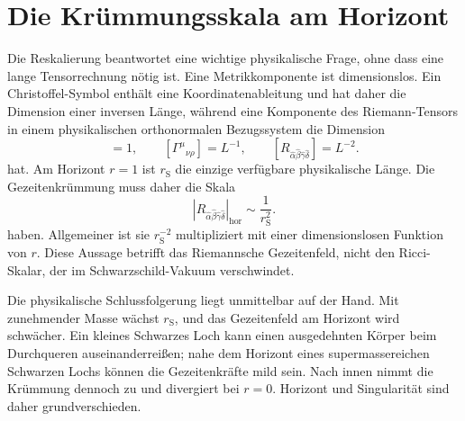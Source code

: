 \begin{classroomqa}
\end{classroomqa}

\section{Die Krümmungsskala am Horizont}

Die Reskalierung beantwortet eine wichtige physikalische Frage, ohne dass eine lange Tensorrechnung nötig ist. Eine Metrikkomponente ist dimensionslos. Ein Christoffel-Symbol enthält eine Koordinatenableitung und hat daher die Dimension einer inversen Länge, während eine Komponente des Riemann-Tensors in einem physikalischen orthonormalen Bezugssystem die Dimension
\begin{equation}
[g_{\mu\nu}]=1,
\qquad
[\Gamma^\mu{}_{\nu\rho}]=L^{-1},
\qquad
[R_{\hat\alpha\hat\beta\hat\gamma\hat\delta}]
=L^{-2}.
\label{eq:l7-curvature-dimensions}
\end{equation}
hat. Am Horizont \(r=1\) ist \(r_{\mathrm S}\) die einzige verfügbare physikalische Länge. Die Gezeitenkrümmung muss daher die Skala
\begin{equation}
\left|R_{\hat\alpha\hat\beta\hat\gamma\hat\delta}\right|_{\mathrm{hor}}
\sim \frac{1}{r_{\mathrm S}^2}.
\label{eq:l7-horizon-curvature}
\end{equation}
haben. Allgemeiner ist sie \(r_{\mathrm S}^{-2}\) multipliziert mit einer dimensionslosen Funktion von \(r\). Diese Aussage betrifft das Riemannsche Gezeitenfeld, nicht den Ricci-Skalar, der im Schwarzschild-Vakuum verschwindet.

Die physikalische Schlussfolgerung liegt unmittelbar auf der Hand. Mit zunehmender Masse wächst \(r_{\mathrm S}\), und das Gezeitenfeld am Horizont wird schwächer. Ein kleines Schwarzes Loch kann einen ausgedehnten Körper beim Durchqueren auseinanderreißen; nahe dem Horizont eines supermassereichen Schwarzen Lochs können die Gezeitenkräfte mild sein. Nach innen nimmt die Krümmung dennoch zu und divergiert bei \(r=0\). Horizont und Singularität sind daher grundverschieden.

